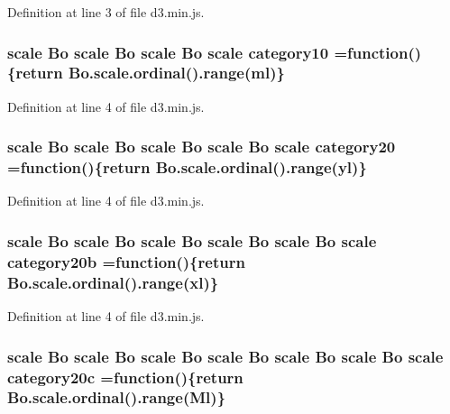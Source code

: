 Definition at line 3 of file d3.\+min.\+js.

\subsubsection[{category10}]{ {\bf scale} {\bf Bo} {\bf scale} {\bf Bo} {\bf scale} {\bf Bo} {\bf scale} category10 =function()\{{\bf return} {\bf Bo.\+scale.\+ordinal}().{\bf range}({\bf ml})\}}\label{d3_8min_8js_aa81d64838ab8188bbc27451a2f35324f}


Definition at line 4 of file d3.\+min.\+js.

\subsubsection[{category20}]{ {\bf scale} {\bf Bo} {\bf scale} {\bf Bo} {\bf scale} {\bf Bo} {\bf scale} {\bf Bo} {\bf scale} category20 =function()\{{\bf return} {\bf Bo.\+scale.\+ordinal}().{\bf range}({\bf yl})\}}\label{d3_8min_8js_a053a21ff77f2486a45c34f1674efbd8d}


Definition at line 4 of file d3.\+min.\+js.

\subsubsection[{category20b}]{ {\bf scale} {\bf Bo} {\bf scale} {\bf Bo} {\bf scale} {\bf Bo} {\bf scale} {\bf Bo} {\bf scale} {\bf Bo} {\bf scale} category20b =function()\{{\bf return} {\bf Bo.\+scale.\+ordinal}().{\bf range}({\bf xl})\}}\label{d3_8min_8js_a6ac813b7ed0de5e029bac697a1e4405e}


Definition at line 4 of file d3.\+min.\+js.

\subsubsection[{category20c}]{ {\bf scale} {\bf Bo} {\bf scale} {\bf Bo} {\bf scale} {\bf Bo} {\bf scale} {\bf Bo} {\bf scale} {\bf Bo} {\bf scale} {\bf Bo} {\bf scale} category20c =function()\{{\bf return} {\bf Bo.\+scale.\+ordinal}().{\bf range}({\bf Ml})\}}\label{d3_8min_8js_a30413f2e285e4af3b96e7e74d50db95e}


